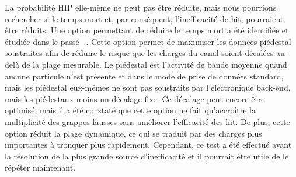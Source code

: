 
La probabilité HIP elle-même ne peut pas être réduite, mais nous pourrions rechercher si le temps mort et, par conséquent, l’inefficacité de hit, pourraient être réduits. Une option permettant de réduire le temps mort a été identifiée et étudiée dans le passé ~\cite{website:hitLoss}. Cette option permet de maximiser les données piédestal soustraites afin de réduire le risque que les charges du canal soient décalées au-delà de la plage mesurable. Le piédestal est l’activité de bande moyenne quand aucune particule n’est présente et dans le mode de prise de données standard, mais les piédestal eux-mêmes ne sont pas soustraits par l’électronique back-end, mais les piédestaux moins un décalage fixe. Ce décalage peut encore être optimisé, mais il a été constaté que cette option ne fait qu’accroître la multiplicité des grappes fausses  sans améliorer l’efficacité des hit. De plus, cette option réduit la plage dynamique, ce qui se traduit par des charges plus importantes à tronquer plus rapidement. Cependant, ce test a été effectué avant la résolution de la plus grande source d’inefficacité et il pourrait être utile de le répéter maintenant.



